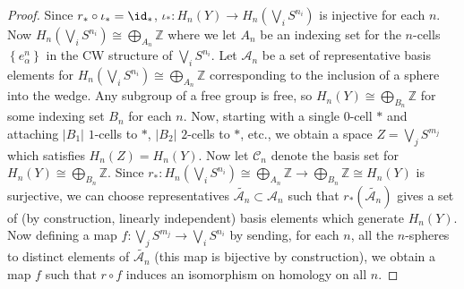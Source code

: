 \begin{proof}
        Since
        $r_* \circ \iota_* = \id_*$, 
        $\iota_* \colon
        H_n (Y) \to H_n\left( \bigvee_i S^{n_i} \right) $ 
        is injective for each $n$.
        Now
        $H_n \left( \bigvee_i S^{n_i} \right) 
        \cong \bigoplus_{A_n} \mathbb{Z}$ where
        we let $A_n$ be an indexing set
        for the $n$-cells $\left\{ e_{\alpha}^{n} \right\} $ 
        in the CW structure of $\bigvee_{i}S^{n_i}$.
        Let $\mathcal{A}_n$ be a set of representative basis
        elements for $H_n \left( \bigvee_i S^{n_i} \right) 
        \cong \bigoplus_{A_n}\mathbb{Z}$ corresponding
        to the inclusion of a sphere into the
        wedge.
        Any
        subgroup of a free group is free, so
        $H_n(Y) \cong
        \bigoplus_{B_n} \mathbb{Z}$ for some
        indexing set $B_n$ for each $n$.
        Now, starting with a single $0$-cell $* $ and
        attaching $\left| B_1 \right| $ $1$-cells to
        $*$, $\left| B_2 \right| $ $2$-cells to $*$, etc.,
        we obtain a space
        $Z = \bigvee_j S^{m_j}$ which satisfies
        $H_n(Z) = H_n(Y)$.
        Now let
        $\mathcal{C}_n$ denote the basis set for
        $H_n (Y) \cong \bigoplus_{B_n} \mathbb{Z}$.
        Since $r_*
        \colon H_n \left( \bigvee_i S^{n_i} \right) 
        \cong \bigoplus_{A_n} \mathbb{Z} \to 
        \bigoplus_{B_n} \mathbb{Z} \cong
        H_n (Y)$ is surjective,
        we can choose representatives
        $\tilde{\mathcal{A}_n} \subset 
        \mathcal{A}_n$ such that
        $r_* \left( \tilde{\mathcal{A}_n} \right) $ 
        gives a set of (by construction, linearly independent) 
        basis elements which generate
        $H_n (Y)$. Now defining a map
        $f \colon \bigvee_j S^{m_j} \to 
        \bigvee_i S^{n_i}$ by sending, for each $n$,
        all the $n$-spheres to distinct elements
        of $\tilde{\mathcal{A}_n}$ (this map is bijective by
        construction), we obtain a map
        $f$ such that
        $r \circ f$ induces an isomorphism on homology on all
        $n$.
    \end{proof}


